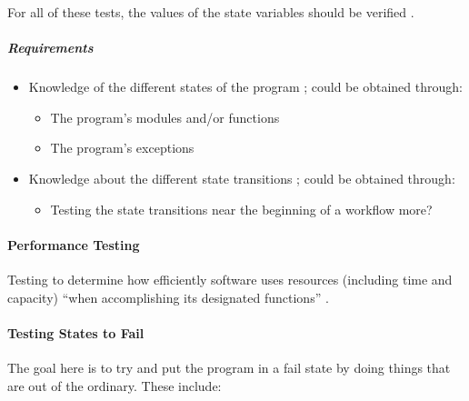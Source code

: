 For all of these tests, the values of the state variables should be verified
\citep[p.~83]{Patton2006}.

\subparagraph{Requirements}
\begin{itemize}
      \item Knowledge of the different states of the program
            \citep[p.~82]{Patton2006}; could be obtained through:
            \begin{itemize}
                  \item The program's modules and/or functions
                  \item The program's exceptions
            \end{itemize}
      \item Knowledge about the different state transitions
            \citep[p.~82]{Patton2006}; could be obtained through:
            \begin{itemize}
                  \item Testing the state transitions near the beginning of a
                        workflow more?
            \end{itemize}
\end{itemize}

\paragraph{Performance Testing}

Testing to determine how efficiently software uses resources (including time
and capacity) ``when accomplishing its designated functions''
\citep{ISTQB}. 



\paragraph{Testing States to Fail \citep[pp.~84-87]{Patton2006}}

The goal here is to try and put the program in a fail state by doing things
that are out of the ordinary. These include:

